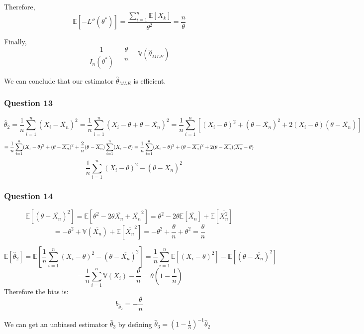 \documentclass[]{article}
\begin{document}
Therefore,
\[\mathbb{E} [-L''(\theta^*)] = \frac{\sum_{i=1}^{n} \mathbb{E}[X_k]}{\theta^2} = \frac{n}{\theta}\]

Finally,
\[\frac{1}{I_n(\theta^*)} = \frac{\theta}{n} = \mathbb{V} (\hat\theta_{MLE})\]

We can conclude that our estimator \(\hat\theta_{MLE}\) is efficient.

\hypertarget{question-13}{%
\subsubsection{Question 13}\label{question-13}}

\[
\hat\theta_{2} = \frac{1}{n} \sum_{i=1}^{n} (X_i - \overline{X_n})^2 = \frac{1}{n} \sum_{i=1}^{n} (X_i - \theta + \theta - \overline{X_n})^2 = \frac{1}{n} \sum_{i=1}^{n} [(X_i - \theta)^2 + (\theta - \overline{X_n} )^2 +2(X_i - \theta)(\theta - \overline{X_n})]
\] \[
= \frac{1}{n} \sum_{i=1}^{n} (X_i - \theta)^2 + (\theta - \overline{X_n} )^2  + \frac{2}{n}(\theta - \overline{X_n}) \sum_{i=1}^{n}(X_i - \theta) \\
= \frac{1}{n} \sum_{i=1}^{n} (X_i - \theta)^2 + (\theta - \overline{X_n} )^2 + 2(\theta - \overline{X_n}) (\overline{X_n} - \theta )
\] \[
= \frac{1}{n} \sum_{i=1}^{n} (X_i - \theta)^2 - (\theta - \overline{X_n})^2
\]

\hypertarget{question-14}{%
\subsubsection{Question 14}\label{question-14}}

\[
\mathbb{E}[(\theta - \overline{X_n})^2] = \mathbb{E}[\theta^2 - 2\theta\overline{X_n} + \overline{X_n}^2] = \theta^2 - 2\theta\mathbb{E}[\overline{X_n}] + \mathbb{E}[\overline{X_n^2}]
\] \[
=- \theta^2 + \mathbb{V}(\overline{X_n}) + \mathbb{E}[\overline{X_n}^2] = - \theta^2 + \frac{\theta}{n} + \theta^2 = \frac{\theta}{n}
\]

\[
\mathbb{E}[\hat\theta_2] = \mathbb{E} [\frac{1}{n} \sum_{i=1}^{n} (X_i - \theta)^2 - (\theta - \overline{X_n})^2] = \frac{1}{n} \sum_{i=1}^{n}\mathbb{E}[(X_i - \theta)^2] - \mathbb{E}[(\theta - \overline{X_n})^2]
\]
\[= \frac{1}{n} \sum_{i=1}^{n}\mathbb{V}(X_i) - \frac{\theta}{n} = \theta(1-\frac{1}{n})\]
Therefore the bias is: \[b_{\hat\theta_2} =  -\frac{\theta}{n}\]

We can get an unbiased estimator \(\hat\theta_3\) by defining
\(\hat\theta_3 = (1-\frac{1}{n}) ^{-1} \hat\theta_2\)
\end{document}
